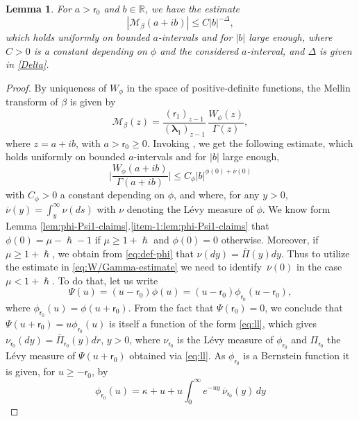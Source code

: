 \documentclass[JEP,XML,SOM,Unicode]{cedram}
\theoremstyle{plain}
\newtheorem{lemma}[theorem]{Lemma}
\theoremstyle{definition}
\newcommand{\R}{\mathbb{R}}
\newcommand{\calM}{\mathcal{M}}
\newcommand{\lam}{{\bm{\lambda}_1}}
\newcommand{\tet}{{\mathsf{r}_0}}
\newcommand{\vat}{{\mathsf{r}_1}}
\let\h\hslash
\let\mo\mu
\let\bpsi\beta
\begin{document}
\begin{lemma}
\label{lem:Mellin-bpsi}
For $a > \tet$ and $b \in \R$, we have the estimate
\begin{equation*}
\left| \calM_\bpsi(a+ib) \right| \leq C|b|^{-\Delta},
\end{equation*}
which holds uniformly on bounded $a$-intervals and for $|b|$ large enough,
where $C > 0$ is a constant depending on $\phi$ and the considered $a$-interval, and $\Delta$ is given in \eqref{Delta}.
\end{lemma}

\begin{proof}
By uniqueness of $W_\phi$ in the space of positive-definite functions, the Mellin transform of $\bpsi$ is given by
\begin{equation*}
\calM_\bpsi(z) = \frac{(\vat)_{z-1}}{(\lam)_{z-1}}\,\frac{W_\phi(z)}{\Gamma(z)},
\end{equation*}
where $z = a+ib$, with $a > \tet \geq 0$. Invoking \cite[Eq.\,(6.20)]{Patie-Savov-Bern}, we get the following estimate, which holds uniformly on bounded $a$-intervals and for $|b|$ large enough,
\begin{equation}
\label{eq:W/Gamma-estimate}
\biggl| \frac{W_\phi(a+ib)}{\Gamma(a+ib)}\biggr| \leq C_\phi |b|^{\phi(0)+\overline{\nu}(0)}
\end{equation}
with $C_\phi > 0$ a constant depending on $\phi$, and where, for any $y > 0$, $\overline{\nu}(y) = \int_y^\infty \nu(ds)$ with $\nu$ denoting the Lévy measure of $\phi$. We know form Lemma \ref{lem:phi-Psi1-claims}.\eqref{item-1:lem:phi-Psi1-claims}
that $\phi(0) = \mo-\h - 1$ if $\mo \ge 1+\h$ and $\phi(0) = 0$ otherwise.
Moreover, if $\mo \ge 1+\h$, we obtain from \eqref{eq:def-phi} that $\nu(dy) = \overline{\Pi}(y)dy$.
Thus to utilize the estimate in \eqref{eq:W/Gamma-estimate} we need to identify~$\overline{\nu}(0)$ in the case $\mo < 1+\h$. To do that, let us write
\[
\Psi(u) = (u-\tet)\phi(u) = (u-\tet)\phi_{\tet}(u-\tet),
\]
where $\phi_{\tet}(u) = \phi(u+\tet)$. From the fact that $\Psi(\tet)=0$, we conclude that $\Psi(u+\tet) = u\phi_{\tet}(u)$ is itself a function of the form \eqref{eq:ll}, which gives $\nu_{\tet}(dy) = \overline{\Pi}_{\tet}(y)dr$, $y>0$, where $\nu_{\tet}$ is the Lévy measure of $\phi_{\tet}$ and
$\Pi_{\tet}$ the Lévy measure of $\Psi(u+\tet)$ obtained via \eqref{eq:ll}. As $\phi_{\tet}$ is a Bernstein function it is given, for $u \geq -\tet$, by
\begin{equation*}
\phi_{\tet}(u) = \kappa+u+u\int_0^\infty e^{-uy}\, \overline{\nu}_{\tet}(y)\,dy

\end{equation*}
\end{proof}
\end{document}
